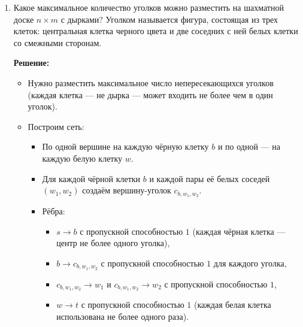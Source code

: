 \begin{enumerate}
\begin{enumerate}
        \textbf{Решение:}

        \begin{itemize}
          \item Из пункта (b) уже следует несходимость: если алгоритм не завершается, он не даёт корректного ответа.

          \item Более явно: в примере из пункта (b) алгоритм строит бесконечную последовательность частичных потоков, сумма приращений $\sum_{k=0}^\infty \delta_k < +\infty$ сходится, но сумма может быть строго меньше значения максимального потока.

          \item Таким образом, частичные потоки сходятся к некоторой вещественной величине, не равной $\mathrm{maxflow}$, а следовательно, соответствующий поток в пределе не является максимальным.
        \end{itemize}
    \end{enumerate}

  \item
    Какое максимальное количество уголков можно разместить на шахматной доске $n \times m$ с дырками?
    Уголком называется фигура, состоящая из трех клеток: центральная клетка черного цвета и две соседних
    с ней белых клетки со смежными сторонам.

    \textbf{Решение:}

    \begin{itemize}
      \item Нужно разместить максимальное число непересекающихся уголков
      (каждая клетка --- не дырка --- может входить не более чем в один уголок).

      \item Построим сеть:
      \begin{itemize}
        \item По одной вершине на каждую чёрную клетку $b$ и по одной --- на каждую белую клетку $w$.
        \item Для каждой чёрной клетки $b$ и каждой пары её белых соседей $(w_1, w_2)$ создаём вершину-уголок $c_{b,w_1,w_2}$.
        \item Рёбра:
        \begin{itemize}
          \item $s \to b$ с пропускной способностью $1$ (каждая чёрная клетка --- центр не более одного уголка),
          \item $b \to c_{b,w_1,w_2}$ с пропускной способностью $1$ для каждого уголка,
          \item $c_{b,w_1,w_2} \to w_1$ и $c_{b,w_1,w_2} \to w_2$ с пропускной способностью $1$,
          \item $w \to t$ с пропускной способностью $1$ (каждая белая клетка использована не более одного раза).
        \end{itemize}
      \end{itemize}


\end{itemize}
\end{enumerate}
